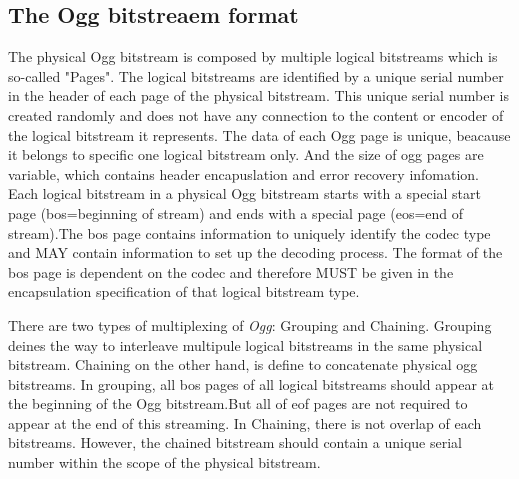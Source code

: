 \subsection{The Ogg bitstreaem format} 
{
The physical Ogg bitstream is composed by multiple logical bitstreams which is so-called "Pages".  
The logical bitstreams are identified by a unique serial number in the header of each page of the physical bitstream.  
This unique serial number is created randomly and does not have any connection to the content or encoder of the logical bitstream it represents. \cite{oggencapsulationformat}  
The data of each Ogg page is unique, beacause it belongs to specific one logical bitstream only. 
And the size of ogg pages are variable, which contains header encapuslation and error recovery infomation.
Each logical bitstream in a physical Ogg bitstream starts with a special start page (bos=beginning of stream) and ends with a special page (eos=end of stream).The bos page contains information to uniquely identify the codec type and MAY contain information to set up the decoding process. The format of the bos page is dependent on the codec and therefore MUST be given in the encapsulation specification of that logical bitstream type. \cite{oggencapsulationformat}


There are two types of multiplexing of \emph{Ogg}: Grouping and Chaining.
Grouping deines the way to interleave multipule logical bitstreams in the same physical bitstream.
Chaining on the other hand, is define to concatenate physical ogg bitstreams.
In grouping, all bos pages of all logical bitstreams should appear at the beginning of the Ogg bitstream.But all of eof pages are not required to appear at the end of this streaming.
In Chaining, there is not overlap of each bitstreams. However, the chained bitstream should contain a unique serial number within the scope of the physical bitstream.
}

